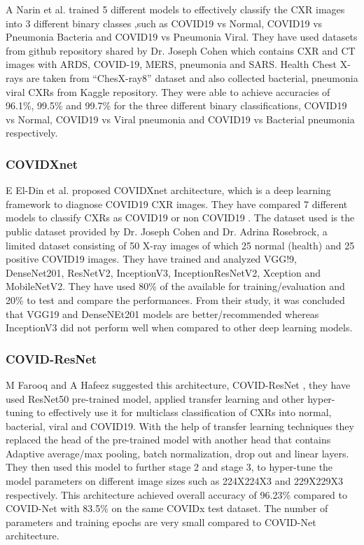 \documentclass{sigkddExp}
\begin{document}
A Narin et al. trained 5 different models to effectively classify the CXR images
into 3 different binary classes \cite{Narin_2021} ,such as COVID19 vs Normal, COVID19 vs
Pneumonia Bacteria and COVID19 vs Pneumonia Viral. They have used datasets from
github repository shared by Dr. Joseph Cohen which contains CXR and CT images
with ARDS, COVID-19, MERS, pneumonia and SARS. Health Chest X-rays are taken
from “ChesX-ray8” dataset and also collected bacterial, pneumonia viral CXRs
from Kaggle repository. They were able to achieve accuracies of 96.1\%, 99.5\% and
99.7\% for the three different binary classifications, COVID19 vs Normal, COVID19
vs Viral pneumonia and COVID19 vs Bacterial pneumonia respectively.

\subsubsection{COVIDXnet}

E El-Din et al. proposed COVIDXnet architecture, which is a deep learning
framework to diagnose COVID19 CXR images. They have compared 7 different models
to classify CXRs as COVID19 or non COVID19 \cite{hemdan2020covidxnet}. The
dataset used is the public dataset provided by Dr. Joseph Cohen and Dr. Adrina
Rosebrock, a limited dataset consisting of 50 X-ray images of which 25 normal
(health) and 25 positive COVID19 images. They have trained and analyzed VGG!9,
DenseNet201, ResNetV2, InceptionV3, InceptionResNetV2, Xception and MobileNetV2.
They have used 80\% of the available for training/evaluation and 20\% to test
and compare the performances. From their study, it was concluded that VGG19 and
DenseNEt201 models are better/recommended whereas InceptionV3 did not perform
well when compared to other deep learning models.

\subsubsection{COVID-ResNet}

M Farooq and A Hafeez suggested this architecture, COVID-ResNet
\cite{farooq2020covidresnet}, they have used ResNet50 pre-trained model, applied
transfer learning and other hyper-tuning to effectively use it for multiclass
classification of CXRs into normal, bacterial, viral and COVID19. With the help
of transfer learning techniques they replaced the head of the pre-trained model
with another head that contains Adaptive average/max pooling, batch
normalization, drop out and linear layers. They then used this model to further
stage 2 and stage 3,  to hyper-tune the model parameters on different image
sizes such as 224X224X3 and 229X229X3 respectively. This architecture achieved
overall accuracy of 96.23\% compared to COVID-Net with 83.5\% on the same COVIDx
test dataset. The number of parameters and training epochs are very small
compared to COVID-Net architecture.
\end{document}
